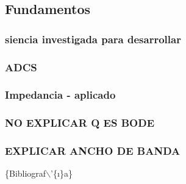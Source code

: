 \subsection{Fundamentos}
\label{sec:org8b0323f}
\subsubsection{siencia investigada para desarrollar}
\label{sec:orgc8c9f62}
\subsubsection{ADCS}
\label{sec:org9985f74}
\subsubsection{Impedancia - aplicado}
\label{sec:orgd8cf818}
\subsubsection{NO EXPLICAR Q ES BODE}
\label{sec:orgbd8b0ad}
\subsubsection{EXPLICAR ANCHO DE BANDA}
\label{sec:org8eeeac5}


\{\numberline{}Bibliograf$\backslash$'\{\i\}a\}





